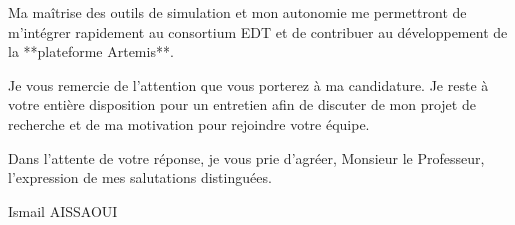 \documentclass[11pt,a4paper]{article}
\begin{document}
Ma maîtrise des outils de simulation et mon autonomie me permettront de m'intégrer rapidement au consortium EDT et de contribuer au développement de la **plateforme Artemis**.

Je vous remercie de l'attention que vous porterez à ma candidature. Je reste à votre entière disposition pour un entretien afin de discuter de mon projet de recherche et de ma motivation pour rejoindre votre équipe.

Dans l'attente de votre réponse, je vous prie d'agréer, Monsieur le Professeur, l'expression de mes salutations distinguées.

\bigskip

\noindent Ismail AISSAOUI
\end{document}
